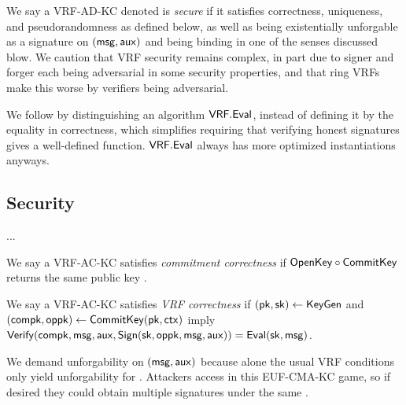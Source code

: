 

We say a VRF-AD-KC denoted \VRF is {\em secure} if it satisfies
 correctness, uniqueness, and pseudorandomness as defined below,
 as well as being existentially unforgable as a signature on $(\mathsf{msg},\mathsf{aux})$
 and being binding in one of the senses discussed blow.
We caution that VRF security remains complex, in part due to
signer and forger each being adversarial in some security properties,
and that ring VRFs make this worse by verifiers being adversarial.

We follow \cite{agg_dkg} by distinguishing an algorithm ${\mathsf{VRF}}.{\mathsf{Eval}}$,
 instead of defining it by the equality in correctness,
which simplifies requiring that verifying honest signatures gives a well-defined function.
${\mathsf{VRF}}.{\mathsf{Eval}}$ always has more optimized instantiations anyways.

\subsection{Security}

...

\begin{definition}
We say a VRF-AC-KC satisfies {\em commitment correctness} if
 ${\mathsf{OpenKey}} \circ {\ensuremath{\mathsf{CommitKey}}}$ returns the same public key \pk.
\end{definition}

\begin{definition}
We say a VRF-AC-KC satisfies {\em VRF correctness} if
$(\mathsf{pk},\mathsf{sk}) \leftarrow {\ensuremath{\mathsf{KeyGen}}}$ and $(\mathsf{compk},\mathsf{oppk}) \leftarrow {\ensuremath{\mathsf{CommitKey}}}(\mathsf{pk},\mathsf{ctx})$
imply
${\mathsf{Verify}}(\mathsf{compk},\mathsf{msg},\mathsf{aux},{\mathsf{Sign}}(\mathsf{sk},\mathsf{oppk},\mathsf{msg},\mathsf{aux})) = {\mathsf{Eval}}(\mathsf{sk},\mathsf{msg})$.
\end{definition}

We demand unforgability on $(\mathsf{msg},\mathsf{aux})$ because alone
 the usual VRF conditions only yield unforgability for \msg.
Attackers access \CommitKey in this EUF-CMA-KC game, so if desired
 they could obtain multiple signatures under the same \compk.

